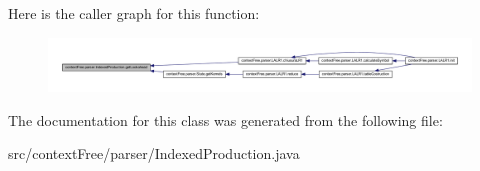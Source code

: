 Here is the caller graph for this function\-:
\nopagebreak
\begin{figure}[H]
\begin{center}
\leavevmode
\includegraphics[width=350pt]{classcontext_free_1_1parser_1_1_indexed_production_a94e0e318a96518ee50607e682e7f0382_icgraph}
\end{center}
\end{figure}




The documentation for this class was generated from the following file\-:\begin{DoxyCompactItemize}
\item 
src/context\-Free/parser/Indexed\-Production.\-java\end{DoxyCompactItemize}
